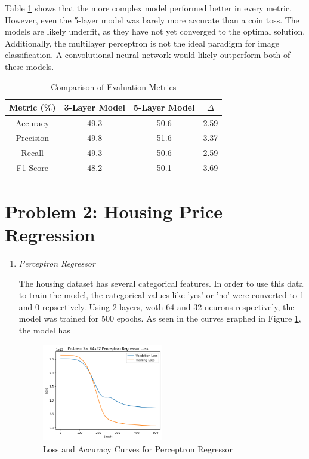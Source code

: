 \documentclass{article}
\begin{document}
\begin{enumerate}[label=1\alph*. ]
Table \ref{tab:comparison1} shows that the more complex
model performed better in every metric. However, even the
5-layer model was barely more accurate than a coin toss. The
models are likely underfit, as they have not yet converged
to the optimal solution. Additionally, the multilayer
perceptron is not the ideal paradigm for image
classification. A convolutional neural network would likely
outperform both of these models.
\begin{table}[h]
    \centering
    \begin{tabular}{|c|c|c|c|}
        \hline
        \textbf{Metric (\%)} & \textbf{3-Layer Model} &
        \textbf{5-Layer Model} & \textbf{$\Delta$} \\
        \hline
        Accuracy & 49.3 & 50.6 & 2.59 \\
        Precision & 49.8 & 51.6 & 3.37 \\
        Recall & 49.3 & 50.6 & 2.59 \\ 
        F1 Score & 48.2 & 50.1 & 3.69 \\
        \hline
    \end{tabular}
    \caption{Comparison of Evaluation Metrics}
    \label{tab:comparison1}
\end{table}
\end{enumerate}

\section{Problem 2: Housing Price Regression}
\begin{enumerate}[label=1\alph*. ]
    \item \textit{Perceptron Regressor}
    
    The housing dataset has several categorical features. In
    order to use this data to train the model, the categorical values like
    'yes' or 'no' were converted to 1 and 0 repsectively. Using 2 layers,
    woth 64 and 32 neurons respectively, the model was trained for 500 epochs.
    As seen in the curves graphed in Figure \ref{fig:loss_2a}, the model has
    \begin{figure}[h]
        \centering
        \includegraphics[width=0.5\textwidth]{images/loss_2a.png}
        \caption{Loss and Accuracy Curves for Perceptron Regressor}
        \label{fig:loss_2a}
    \end{figure}


\end{enumerate}
\end{document}
